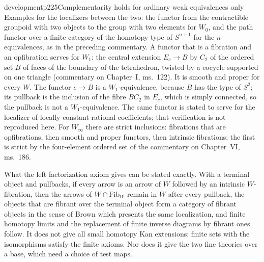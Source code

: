 \begin{dcomment}{development}{p225}{Complementarity holds for ordinary weak equivalences only}
Examples for the localizers between the two: the functor from the contractible groupoid with two objects to the group with two elements for $W_0$, and the path functor over a finite category of the homotopy type of $S^{n+1}$ for the $n$-equivalences, as in the preceding commentary. A functor that is a fibration and an opfibration serves for $W_1$: the central extension $E_c\to B$ by $C_2$ of the ordered set $B$ of faces of the boundary of the tetrahedron, twisted by a cocycle supported on one triangle (commentary on Chapter~I, ms.~122). It is smooth and proper for every $W$. The functor $e\to B$ is a $W_1$-equivalence, because $B$ has the type of $S^2$; its pullback is the inclusion of the fibre $BC_2$ in $E_c$, which is simply connected, so the pullback is not a $W_1$-equivalence. The same functor is stated to serve for the localizer of locally constant rational coefficients; that verification is not reproduced here. For $W_\infty$ there are strict inclusions: fibrations that are opfibrations, then smooth and proper functors, then intrinsic fibrations; the first is strict by the four-element ordered set of the commentary on Chapter~VI, ms.~186.
\end{dcomment}

What the left factorization axiom gives can be stated exactly. With a terminal object and pullbacks, if every arrow is an arrow of $W$ followed by an intrinsic $W$-fibration, then the arrows of $W\cap\mathrm{Fib}_W$ remain in $W$ after every pullback, the objects that are fibrant over the terminal object form a category of fibrant objects in the sense of Brown which presents the same localization, and finite homotopy limits and the replacement of finite inverse diagrams by fibrant ones follow. It does not give all small homotopy Kan extensions: finite sets with the isomorphisms satisfy the finite axioms. Nor does it give the two fine theories over a base, which need a choice of test maps.

